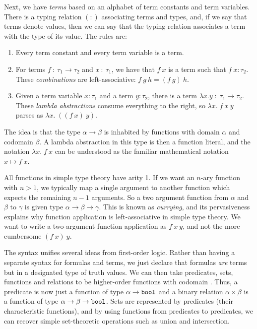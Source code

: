 Next, we have \emph{terms} based on an alphabet of term constants and term variables. There is a typing relation $(:)$ associating terms and types, and, if we say that terms denote values, then we can say that the typing relation associates a term with the type of its value. The rules are:
\begin{enumerate}
\item Every term constant and every term variable is a term.
\item For terms $f\ :\ \tau_1\rightarrow\tau_2$ and $x\ :\ \tau_1$, we have that $f\ x$ is a term such that \mbox{$f\ x : \tau_2$}. These \emph{combinations} are left-associative: $f\ g\ h = (f\ g)\ h$.
\item Given a term variable $x : \tau_1$ and a term $y : \tau_2$, there is a term $\lambda x. y\;:\;\tau_1 \rightarrow \tau_2$. These \emph{lambda abstractions} consume everything to the right, so $\lambda x.\; f\ x\ y$ parses as $\lambda x.\; ((f\ x)\ y)$.
\end{enumerate}

The idea is that the type $\alpha \rightarrow \beta$ is inhabited by functions with domain $\alpha$ and codomain $\beta$. A lambda abstraction in this type is then a function literal, and the notation $\lambda x.\; f\ x$ can be understood as the familiar mathematical notation $x \mapsto f\ x$.

All functions in simple type theory have arity 1. If we want an $n$-ary function with \mbox{$n>1$}, we typically map a single argument to another function which expects the remaining $n-1$ arguments. So a two argument function from $\alpha$ and $\beta$ to $\gamma$ is given type $\alpha \rightarrow \beta \rightarrow \gamma$. This is known as \emph{currying}, and its pervasiveness explains why function application is left-associative in simple type theory. We want to write a two-argument function application as $f\ x\ y$, and not the more cumbersome $(f\ x)\ y$.

The syntax unifies several ideas from first-order logic. Rather than having a separate syntax for formulas and terms, we just declare that formulas \emph{are} terms but in a designated type  of truth values. We can then take predicates, sets, functions and relations to be higher-order functions with codomain . Thus, a predicate is now just a function of type $\alpha \rightarrow \texttt{bool}$ and a binary relation $\alpha \times \beta$ is a function of type $\alpha \rightarrow \beta \rightarrow \texttt{bool}$. Sets are represented by predicates (their characteristic functions), and by using functions from predicates to predicates, we can recover simple set-theoretic operations such as union and intersection.

